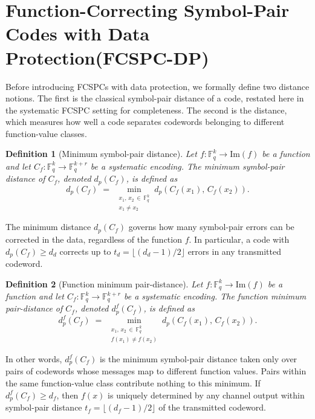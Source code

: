 \documentclass[11pt,draftclsnofoot,journal,onecolumn]{IEEEtran}
\newtheorem{definition}{Definition}
\begin{document}
\section{Function-Correcting Symbol-Pair Codes with Data Protection(FCSPC-DP)}\label{sec:fcspc-dp}
    Before introducing FCSPCs with data protection, we formally define two distance notions. The first is the classical symbol-pair distance of a code, restated here in the systematic FCSPC setting for completeness. The second is the distance, which measures how well a code separates codewords belonging to different function-value classes.
 
    \begin{definition}[Minimum symbol-pair distance]
        \label{def:min-dist-data}
        Let $f : \mathbb{F}_q^k \to \mathrm{Im}(f)$ be a function and let $C_f : \mathbb{F}_q^k \to \mathbb{F}_q^{k+r}$ be a systematic encoding. The {minimum symbol-pair distance} of $C_f$, denoted $d_p(C_f)$, is defined as
        \[
            d_p(C_f)
            \;=\;
            \min_{\substack{x_1,\, x_2 \,\in\, \mathbb{F}_q^k \\ x_1 \neq x_2}}
            d_p\!\left(C_f(x_1),\, C_f(x_2)\right).
        \]
    \end{definition}
 
    \noindent
    The minimum distance $d_p(C_f)$ governs how many symbol-pair errors can be corrected in the data, regardless of the function $f$.  In particular, a code with $d_p(C_f) \geq d_d$ corrects up to $t_d = \lfloor(d_d-1)/2\rfloor$ errors in any transmitted codeword.
    

    \begin{definition}[Function minimum pair-distance]
    \label{def:min-dist-function}
    Let $f : \mathbb{F}_q^k \to \mathrm{Im}(f)$ be a function and let $C_f : \mathbb{F}_q^k \to \mathbb{F}_q^{k+r}$ be a systematic encoding. The {function minimum pair-distance} of $C_f$, denoted $d_p^f(C_f)$, is defined as
    \[
        d_p^f(C_f)
    \;=\;
    \min_{\substack{x_1,\, x_2 \,\in\, \mathbb{F}_q^k \\
                    f(x_1) \neq f(x_2)}}
    d_p\!\left(C_f(x_1),\, C_f(x_2)\right).
    \]
    \end{definition}
    \noindent
    In other words, $d_p^f(C_f)$ is the minimum symbol-pair distance taken {only} over pairs of codewords whose messages map to {different} function values.  Pairs within the same function-value class contribute nothing to this minimum. If $d_p^f(C_f) \geq d_f$, then $f(x)$ is uniquely determined by any channel output within symbol-pair distance $t_f = \lfloor (d_f-1)/2 \rfloor$ of the transmitted codeword.
    
\end{document}

